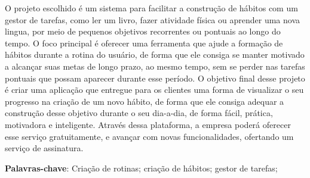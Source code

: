 \setlength{\absparsep}{18pt} %
\begin{resumo}

  O projeto escolhido é um sistema para facilitar a construção de hábitos com um gestor de tarefas, como ler um livro,
  fazer atividade física ou aprender uma nova lingua, por meio de pequenos objetivos recorrentes ou pontuais ao longo do
  tempo. O foco principal é oferecer uma ferramenta que ajude a formação de hábitos durante a rotina do usuário, de forma
  que ele consiga se manter motivado a alcançar suas metas de longo prazo, ao mesmo tempo, sem se perder nas tarefas
  pontuais que possam aparecer durante esse período. O objetivo final desse projeto é criar uma aplicação que entregue
  para os clientes uma forma de visualizar o seu progresso na criação de um novo hábito, de forma que ele consiga adequar
  a construção desse objetivo durante o seu dia-a-dia, de forma fácil, prática, motivadora e inteligente. Através dessa
  plataforma, a empresa poderá oferecer esse serviço gratuitamente, e avançar com novas funcionalidades, ofertando um
  serviço de assinatura.

 \textbf{Palavras-chave}: Criação de rotinas; criação de hábitos; gestor de tarefas;
\end{resumo}
